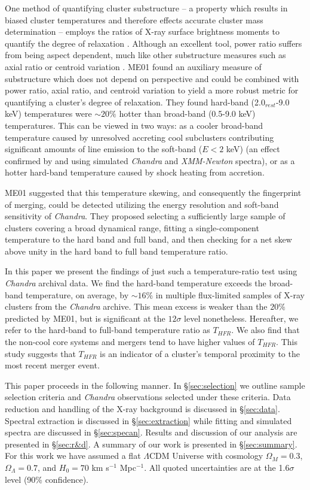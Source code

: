 \documentclass{emulateapj}
\begin{document}
One method of quantifying cluster substructure -- a property which
results in biased cluster temperatures and therefore effects accurate
cluster mass determination -- employs the ratios of X-ray surface brightness
moments to quantify the degree of relaxation
\citep{1995ApJ...452..522B, 1996ApJ...458...27B,
2005ApJ...624..606J}. Although an excellent tool, power ratio suffers
from being aspect dependent, much like other substructure measures
such as axial ratio or centroid variation \citep{2007arXiv0708.1518J,
VV08}. ME01 found an auxiliary measure of substructure which does not
depend on perspective and could be combined with power ratio, axial
ratio, and centroid variation to yield a more robust metric for
quantifying a cluster's degree of relaxation. They found hard-band
(2.0$_{rest}$-9.0 keV) temperatures were $\sim 20\%$ hotter than
broad-band (0.5-9.0 keV) temperatures. This can be viewed in two ways:
as a cooler broad-band temperature caused by unresolved accreting cool
subclusters contributing significant amounts of line emission to the
soft-band ($E < 2$ keV) (an effect confirmed by
\cite{2004MNRAS.354...10M} and \cite{2006ApJ...640..710V} using
simulated {\it Chandra} and {\textit{XMM-Newton}} spectra), or as a hotter
hard-band temperature caused by shock heating from accretion.

ME01 suggested that this temperature skewing, and consequently the
fingerprint of merging, could be detected utilizing the energy
resolution and soft-band sensitivity of {\it Chandra}. They
proposed selecting a sufficiently large sample of clusters covering a
broad dynamical range, fitting a single-component temperature to the
hard band and full band, and then checking for a net skew above
unity in the hard band to full band temperature ratio.

In this paper we present the findings of just such a temperature-ratio
test using {\it Chandra} archival data. We find the hard-band temperature
exceeds the broad-band temperature, on average, by $\sim16\%$
in multiple flux-limited samples of X-ray clusters from the {\it Chandra}
archive. This mean excess is weaker than the $20\%$
predicted by ME01, but is significant at the $12\sigma$ level
nonetheless. Hereafter, we refer to the hard-band to full-band
temperature ratio as $T_{HFR}$. We also find that the non-cool core systems
and mergers tend to have higher values of $T_{HFR}$. This study suggests
that $T_{HFR}$ is an indicator of a cluster's temporal proximity to
the most recent merger event.

This paper proceeds in the following manner. In \S\ref{sec:selection}
we outline sample selection criteria and {\it Chandra}
observations selected under these criteria. Data reduction and
handling of the X-ray background is discussed in
\S\ref{sec:data}. Spectral extraction is discussed in
\S\ref{sec:extraction} while fitting and simulated spectra are
discussed in \S\ref{sec:specan}. Results and discussion of our
analysis are presented in \S\ref{sec:r&d}. A summary of our work
is presented in \S\ref{sec:summary}. For this work we have assumed a
flat $\Lambda$CDM Universe with cosmology $\Omega_{M} = 0.3$,
$\Omega_{\Lambda} = 0.7$, and $H_{0} = 70$ km s$^{-1}$ Mpc$^{-1}$. All
quoted uncertainties are at the 1.6$\sigma$ level (90\% confidence).
\end{document}
